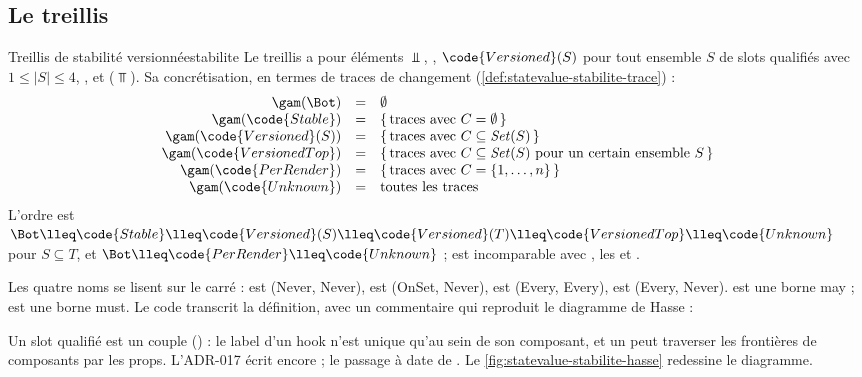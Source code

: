 \subsection{Le treillis }

\begin{definition}{Treillis de stabilité versionnée}{stabilite}
  Le treillis  a pour éléments $\Bot$, ,
  $\code{Versioned}(S)$ pour tout ensemble $S$ de slots qualifiés avec
  $1 \le |S| \le 4$, ,  et
   ($\Top$). Sa concrétisation, en termes de traces de
  changement (\cref{def:statevalue-stabilite-trace}) :
  \[
  \begin{array}{rcl}
    \gam(\Bot) &=& \emptyset\\
    \gam(\code{Stable}) &=& \{\, \text{traces avec } C = \emptyset \,\}\\
    \gam(\code{Versioned}(S)) &=& \{\, \text{traces avec } C \subseteq \mathit{Set}(S) \,\}\\
    \gam(\code{VersionedTop}) &=& \{\, \text{traces avec } C \subseteq \mathit{Set}(S) \text{ pour un certain ensemble } S \,\}\\
    \gam(\code{PerRender}) &=& \{\, \text{traces avec } C = \{1, \dots, n\} \,\}\\
    \gam(\code{Unknown}) &=& \text{toutes les traces}
  \end{array}
  \]
  L'ordre est $\Bot \lleq \code{Stable} \lleq \code{Versioned}(S) \lleq
  \code{Versioned}(T) \lleq \code{VersionedTop} \lleq \code{Unknown}$ pour
  $S \subseteq T$, et $\Bot \lleq \code{PerRender} \lleq \code{Unknown}$ ;
   est incomparable avec , les
   et .
\end{definition}

Les quatre noms se lisent sur le carré :  est (Never, Never),
 est (OnSet, Never),  est (Every, Every),
 est (Every, Never).  est une borne may ;
 est une borne must. Le code transcrit la définition, avec un
commentaire qui reproduit le diagramme de Hasse :


Un slot qualifié  est un couple  () : le label d'un hook n'est unique
qu'au sein de son composant, et un  peut traverser les
frontières de composants par les props. L'ADR-017 écrit encore
 ; le passage à  date de
. Le \cref{fig:statevalue-stabilite-hasse} redessine le diagramme.

